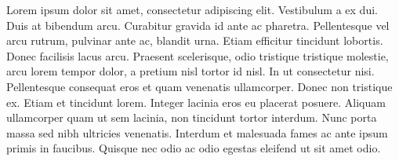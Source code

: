 Lorem ipsum dolor sit amet, consectetur adipiscing elit. Vestibulum a ex dui. Duis at bibendum arcu. Curabitur gravida id ante ac pharetra. Pellentesque vel arcu rutrum, pulvinar ante ac, blandit urna. Etiam efficitur tincidunt lobortis. Donec facilisis lacus arcu. Praesent scelerisque, odio tristique tristique molestie, arcu lorem tempor dolor, a pretium nisl tortor id nisl. In ut consectetur nisi. Pellentesque consequat eros et quam venenatis ullamcorper. Donec non tristique ex. Etiam et tincidunt lorem. Integer lacinia eros eu placerat posuere. Aliquam ullamcorper quam ut sem lacinia, non tincidunt tortor interdum. Nunc porta massa sed nibh ultricies venenatis. Interdum et malesuada fames ac ante ipsum primis in faucibus. Quisque nec odio ac odio egestas eleifend ut sit amet odio.
